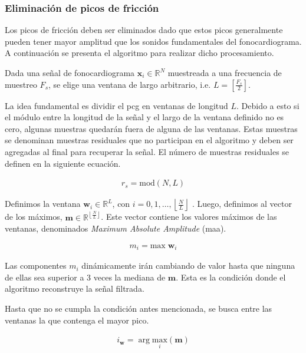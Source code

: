 \pagebreak

\subsubsection*{Eliminación de picos de fricción}

\indent Los picos de fricción deben ser eliminados dado que estos picos generalmente pueden tener mayor amplitud que
los sonidos fundamentales del fonocardiograma. A continuación se presenta el algoritmo para realizar dicho
procesamiento. \bigskip

\indent Dada una señal de fonocardiograma $\bm{x}_i \in \mathbb{R}^N$ muestreada a una frecuencia de muestreo $F_s$,
se elige una ventana de largo arbitrario, i.e. $L = \left[\frac{F_s}{2}\right]$. \bigskip

\indent La idea fundamental es dividir el \acrshort{pcg} en ventanas de longitud $L$. Debido a esto si el módulo
entre la longitud de la señal y el largo de la ventana definido no es cero, algunas muestras quedarán fuera de
alguna de las ventanas. Estas muestras se denominan muestras residuales que no participan en el algoritmo y deben
ser agregadas al final para recuperar la señal. El número de muestras residuales se definen en la siguiente ecuación.

\begin{align}
  r_s = \mathrm{mod}(N,L)
\end{align}

\indent Definimos la ventana $\bm{w}_i \in \mathbb{R}^L$, con $i = 0,1,\dots,\left\lfloor \frac{N}{L} \right\rfloor$
. Luego, definimos al vector de los máximos, $\bm{m} \in \mathbb{R}^{\left\lfloor \frac{N}{L} \right\rfloor}$. Este
vector contiene los valores máximos de las ventanas, denominados \textit{Maximum Absolute Amplitude} (\acrshort{maa}).

\begin{align}
  m_i = \mathrm{max} \; \bm{w}_i
\end{align}

\indent Las componentes $m_i$ dinámicamente irán cambiando de valor hasta que ninguna de ellas sea superior a 3
veces la mediana de $\bm{m}$. Esta es la condición donde el algoritmo reconstruye la señal filtrada. \bigskip

\indent Hasta que no se cumpla la condición antes mencionada, se busca entre las ventanas la que contenga el mayor
pico.

\begin{align}
  i_{\bm{w}} = \arg \underset{i}{\mathrm{max}} (\bm{m})
\end{align}

